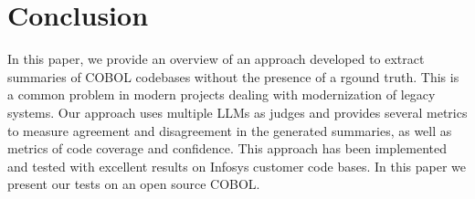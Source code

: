 \section{Conclusion}
In this paper, we provide an overview of an approach developed to extract summaries of COBOL codebases without the presence of a rgound truth. This is a common problem in modern projects dealing with modernization of legacy systems. Our approach uses multiple LLMs as judges and provides several metrics to measure agreement and disagreement in the generated summaries, as well as metrics of code coverage and confidence. This approach has been implemented and tested with excellent results on Infosys customer code bases. In this paper we present our tests on an open source COBOL.